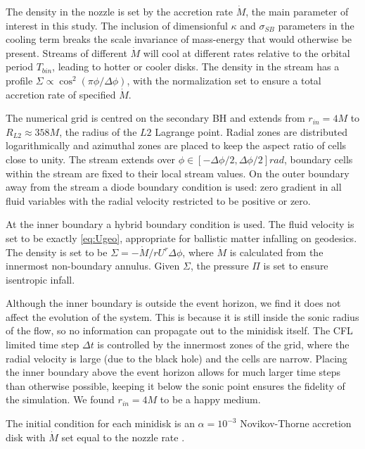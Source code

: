 \documentclass{emulateapj}
\newcommand{\al}{\alpha}
\newcommand{\De}{\Delta}
\newcommand{\sig}{\sigma}
\newcommand{\Sig}{\Sigma}
\newcommand{\ka}{\kappa}
\begin{document}
The density in the nozzle is set by the accretion rate $\dot{M}$, the main parameter of interest in this study.  The inclusion of dimensionful $\ka$ and $\sig_{SB}$ parameters in the cooling term breaks the scale invariance of mass-energy that would otherwise be present.  Streams of different $\dot{M}$ will cool at different rates relative to the orbital period $T_{bin}$, leading to hotter or cooler disks.  The density in the stream has a profile $\Sig \propto \cos^2(\pi \phi / \De \phi)$, with the normalization set to ensure a total accretion rate of specified $\dot{M}$.

The numerical grid is centred on the secondary BH and extends from $r_{in} = 4 M$ to $R_{L2} \approx 358 M$, the radius of the $L2$ Lagrange point. Radial zones are distributed logarithmically and azimuthal zones are placed to keep the aspect ratio of cells close to unity. The stream extends over $\phi \in [-\De \phi / 2, \De \phi / 2] rad$, boundary cells within the stream are fixed to their local stream values. On the outer boundary away from the stream a diode boundary condition is used: zero gradient in all fluid variables with the radial velocity restricted to be positive or zero.

At the inner boundary a hybrid boundary condition is used.  The fluid velocity is set to be exactly \eqref{eq:Ugeo}, appropriate for ballistic matter infalling on geodesics.  The density is set to be $\Sig = -\dot{M} / r U^r \De \phi$, where $\dot{M}$ is calculated from the innermost non-boundary annulus.  Given $\Sig$, the pressure $\Pi$ is set to ensure isentropic infall.

Although the inner boundary is outside the event horizon, we find it does not affect the evolution of the system.  This is because it is still inside the sonic radius of the flow, so no information can propagate out to the minidisk itself.  The CFL limited time step $\De t$ is controlled by the innermost zones of the grid, where the radial velocity is large (due to the black hole) and the cells are narrow.  Placing the inner boundary above the event horizon allows for much larger time steps than otherwise possible, keeping it below the sonic point ensures the fidelity of the simulation.  We found $r_{in} = 4M$ to be a happy medium.

The initial condition for each minidisk is an $\al=10^{-3}$ Novikov-Thorne accretion disk with $\dot{M}$ set equal to the nozzle rate \citep{Novikov73}.  
\end{document}

